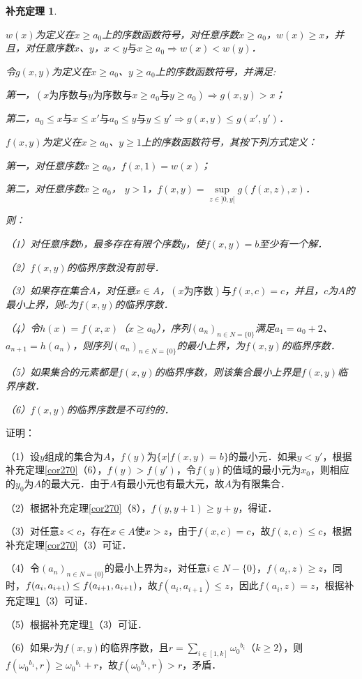\documentclass[12pt, a4paper, oneside]{book}
\newtheorem{cor}{补充定理}
\begin{document}
			\begin{cor}\label{cor356}
				\hfill\par
				\par
				$w(x)$为定义在$x\geq a_0$上的序数函数符号，对任意序数$x\geq a_0$，$w(x)\geq x$，并且，对任意序数$x$、$y$，$x<y\text{与}x\geq a_0\Rightarrow w(x)<w(y)$．
				\par
				令$g(x, y)$为定义在$x\geq a_0$、$y\geq a_0$上的序数函数符号，并满足:
				\par
				第一，$(x\text{为序数}\text{与}y\text{为序数}\text{与}x\geq a_0\text{与}y\geq a_0)\Rightarrow g(x, y)>x$；
				\par
				第二，$a_0\leq x\text{与}x\leq x'\text{与}a_0\leq y\text{与}y\leq y'\Rightarrow g(x, y)\leq g(x', y')$．
				\par
				$f(x, y)$为定义在$x\geq a_0$、$y\geq 1$上的序数函数符号，其按下列方式定义：
				\par
				第一，对任意序数$x\geq a_0$，$f(x, 1)=w(x)$；
				\par
				第二，对任意序数$x\geq a_0$， $y>1$，$f(x, y)=\mathop{sup}\limits_{z\in ]0, y[}g(f(x, z), x)$．
				\par
				则：
				\par
				（1）对任意序数$b$，最多存在有限个序数$y$，使$f(x, y)=b$至少有一个解．
				\par
				（2）$f(x, y)$的临界序数没有前导．
				\par
				（3）如果存在集合$A$，对任意$x\in A$，$(x\text{为序数})\text{与}f(x, c)=c$，并且，$c$为$A$的最小上界，则$c$为$f(x, y)$的临界序数．
				\par
				（4）令$h(x)=f(x, x)$（$x\geq a_0$），序列$(a_n)_{n\in N=\{0\}}$满足$a_1=a_0+2$、$a_{n+1}=h(a_n)$，则序列$(a_n)_{n\in N=\{0\}}$的最小上界，为$f(x, y)$的临界序数．
				\par
				（5）如果集合的元素都是$f(x, y)$的临界序数，则该集合最小上界是$f(x, y)$临界序数．
				\par
				（6）$f(x, y)$的临界序数是不可约的．
			\end{cor}
			证明：
			\par
			（1）设$y$组成的集合为$A$，$f(y)$为$\{x|f(x, y)=b\}$的最小元．如果$y<y'$，根据补充定理\ref{cor270}（6），$f(y)>f(y')$，令$f(y)$的值域的最小元为$x_0$，则相应的$y_0$为$A$的最大元．由于$A$有最小元也有最大元，故$A$为有限集合．
			\par
			（2）根据补充定理\ref{cor270}（8），$f(y, y+1)\geq y+y$，得证．
			\par
			（3）对任意$z<c$，存在$x\in A$使$x>z$，由于$f(x, c)=c$，故$f(z, c)\leq c$，根据补充定理\ref{cor270}（3）可证．
			\par
			（4）令$(a_n)_{n\in N=\{0\}}$的最小上界为$z$，对任意$i\in N-\{0\}$，$f(a_i, z)\geq z$，同时，$f(a_i, a_{i+1})\\\leq f(a_{i+1}, a_{i+1})$，故$f(a_i, a_{i+1})\leq z$，因此$f(a_i, z)=z$，根据补充定理\ref{cor356}（3）可证．
			\par
			（5）根据补充定理\ref{cor356}（3）可证．
			\par
			（6）如果$r$为$f(x, y)$的临界序数，且$r=\sum\limits_{i\in [1, k]}{\omega_0}^{b_i}$（$k\geq 2$），则$f({\omega_0}^{b_1}, r)\geq {\omega_0}^{b_1}+r$，故$f({\omega_0}^{b_1}, r)>r$，矛盾．
			
\end{document}
